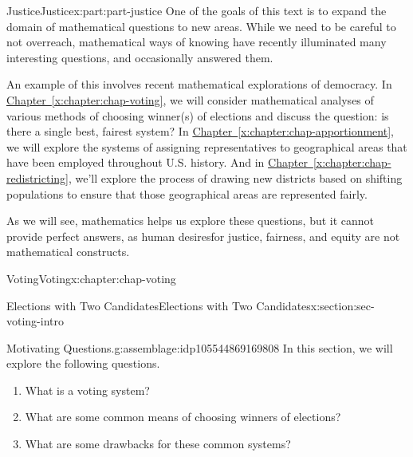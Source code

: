 \documentclass[oneside,10pt,]{book}
\newcommand{\xreffont}{\relax}
\numberwithin{equation}{section}
\begin{document}
\begin{partptx}{Justice}{}{Justice}{}{}{x:part:part-justice}
 One of the goals of this text is to expand the domain of mathematical questions to new areas. While we need to be careful to not overreach, mathematical ways of knowing have recently illuminated many interesting questions, and occasionally answered them.%
\par
An example of this involves recent mathematical explorations of democracy. In \hyperref[x:chapter:chap-voting]{Chapter~{\xreffont\ref{x:chapter:chap-voting}}}, we will consider mathematical analyses of various methods of choosing winner(s) of elections and discuss the question: is there a single best, fairest system? In \hyperref[x:chapter:chap-apportionment]{Chapter~{\xreffont\ref{x:chapter:chap-apportionment}}}, we will explore the systems of assigning representatives to geographical areas that have been employed throughout U.S. history. And in \hyperref[x:chapter:chap-redistricting]{Chapter~{\xreffont\ref{x:chapter:chap-redistricting}}}, we'll explore the process of drawing new districts based on shifting populations to ensure that those geographical areas are represented fairly.%
\par
As we will see, mathematics helps us explore these questions, but it cannot provide perfect answers, as human desires\textemdash{}for justice, fairness, and equity\textemdash{} are not mathematical constructs.%
%
\typeout{************************************************}
\typeout{************************************************}
%
\begin{chapterptx}{Voting}{}{Voting}{}{}{x:chapter:chap-voting}
%
%
\typeout{************************************************}
\typeout{************************************************}
%
\begin{sectionptx}{Elections with Two Candidates}{}{Elections with Two Candidates}{}{}{x:section:sec-voting-intro}
\begin{assemblage}{Motivating Questions.}{g:assemblage:idp105544869169808}%
In this section, we will explore the following questions. %
\begin{enumerate}
\item{}What is a voting system?%
\item{}What are some common means of choosing winners of elections?%
\item{}What are some drawbacks for these common systems?%
\end{enumerate}

\end{assemblage}
\end{sectionptx}
\end{chapterptx}
\end{partptx}
\end{document}
